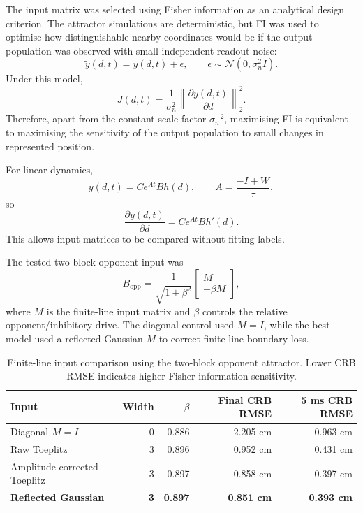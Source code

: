 The input matrix was selected using Fisher information as an analytical design criterion. The attractor simulations are deterministic, but FI was used to optimise how distinguishable nearby coordinates would be if the output population was observed with small independent readout noise:
\begin{equation}
    \tilde{y}(d,t)
    =
    y(d,t)+\epsilon,
    \qquad
    \epsilon \sim \mathcal{N}(0,\sigma_n^2 I).
\end{equation}
Under this model,
\begin{equation}
    J(d,t)
    =
    \frac{1}{\sigma_n^2}
    \left\|
        \frac{\partial y(d,t)}{\partial d}
    \right\|_2^2 .
\end{equation}
Therefore, apart from the constant scale factor $\sigma_n^{-2}$, maximising FI is equivalent to maximising the sensitivity of the output population to small changes in represented position.

For linear dynamics,
\begin{equation}
    y(d,t)
    =
    C e^{At} B h(d),
    \qquad
    A=\frac{-I+W}{\tau},
\end{equation}
so
\begin{equation}
    \frac{\partial y(d,t)}{\partial d}
    =
    C e^{At} B h'(d).
\end{equation}
This allows input matrices to be compared without fitting labels.

The tested two-block opponent input was
\begin{equation}
    B_{\mathrm{opp}}
    =
    \frac{1}{\sqrt{1+\beta^2}}
    \begin{bmatrix}
        M\\
        -\beta M
    \end{bmatrix},
\end{equation}
where $M$ is the finite-line input matrix and $\beta$ controls the relative opponent/inhibitory drive. The diagonal control used $M=I$, while the best model used a reflected Gaussian $M$ to correct finite-line boundary loss.

\begin{table}[htbp]
    \centering
    \caption{Finite-line input comparison using the two-block opponent attractor. Lower CRB RMSE indicates higher Fisher-information sensitivity.}
    \label{tab:cann_fi_input_comparison}
    \begin{tabular}{lrrrr}
        \toprule
        \textbf{Input} & \textbf{Width} & \textbf{$\beta$} & \textbf{Final CRB RMSE} & \textbf{5 ms CRB RMSE} \\
        \midrule
        Diagonal $M=I$ & 0 & 0.886 & 2.205 cm & 0.963 cm \\
        Raw Toeplitz & 3 & 0.896 & 0.952 cm & 0.431 cm \\
        Amplitude-corrected Toeplitz & 3 & 0.897 & 0.858 cm & 0.397 cm \\
        \textbf{Reflected Gaussian} & \textbf{3} & \textbf{0.897} & \textbf{0.851 cm} & \textbf{0.393 cm} \\
        \bottomrule
    \end{tabular}
\end{table}

